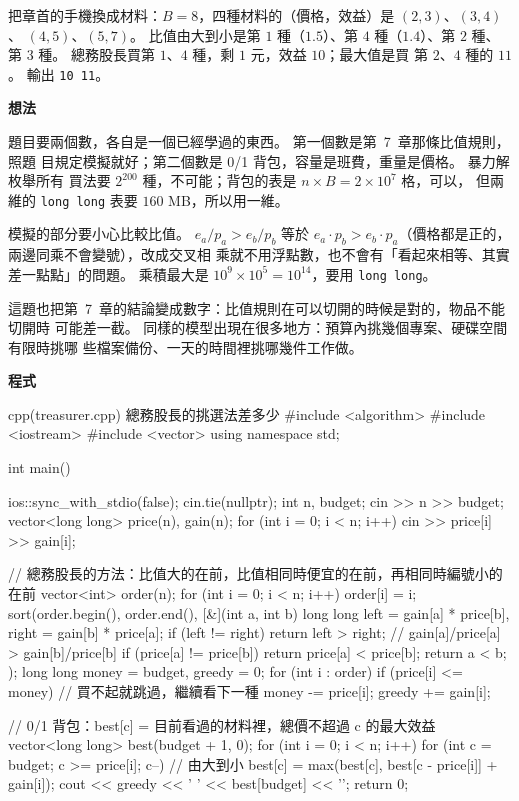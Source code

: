 把章首的手機換成材料：$B = 8$，四種材料的（價格，效益）是 $(2, 3)$、$(3, 4)$、
$(4, 5)$、$(5, 7)$。 比值由大到小是第 $1$ 種（$1.5$）、第 $4$ 種（$1.4$）、第
$2$ 種、第 $3$ 種。 總務股長買第 $1$、$4$ 種，剩 $1$ 元，效益 $10$；最大值是買
第 $2$、$4$ 種的 $11$。 輸出 \texttt{10 11}。

\textbf{想法}

題目要兩個數，各自是一個已經學過的東西。 第一個數是第~7~章那條比值規則，照題
目規定模擬就好；第二個數是 0/1 背包，容量是班費，重量是價格。 暴力解枚舉所有
買法要 $2^{200}$ 種，不可能；背包的表是 $n \times B = 2 \times 10^7$ 格，可以，
但兩維的 \texttt{long long} 表要 $160$ MB，所以用一維。

模擬的部分要小心比較比值。 $e_a / p_a > e_b / p_b$ 等於
$e_a \cdot p_b > e_b \cdot p_a$（價格都是正的，兩邊同乘不會變號），改成交叉相
乘就不用浮點數，也不會有「看起來相等、其實差一點點」的問題。 乘積最大是
$10^9 \times 10^5 = 10^{14}$，要用 \texttt{long long}。

這題也把第~7~章的結論變成數字：比值規則在可以切開的時候是對的，物品不能切開時
可能差一截。 同樣的模型出現在很多地方：預算內挑幾個專案、硬碟空間有限時挑哪
些檔案備份、一天的時間裡挑哪幾件工作做。

\textbf{程式}

\begin{example}[label=ex:treasurer]{cpp}{(treasurer.cpp) 總務股長的挑選法差多少}
#include <algorithm>
#include <iostream>
#include <vector>
using namespace std;

int main() {
    ios::sync_with_stdio(false);
    cin.tie(nullptr);
    int n, budget;
    cin >> n >> budget;
    vector<long long> price(n), gain(n);
    for (int i = 0; i < n; i++) {
        cin >> price[i] >> gain[i];
    }

    // 總務股長的方法：比值大的在前，比值相同時便宜的在前，再相同時編號小的在前
    vector<int> order(n);
    for (int i = 0; i < n; i++) {
        order[i] = i;
    }
    sort(order.begin(), order.end(), [&](int a, int b) {
        long long left = gain[a] * price[b], right = gain[b] * price[a];
        if (left != right) {
            return left > right;          // gain[a]/price[a] > gain[b]/price[b]
        }
        if (price[a] != price[b]) {
            return price[a] < price[b];
        }
        return a < b;
    });
    long long money = budget, greedy = 0;
    for (int i : order) {
        if (price[i] <= money) {          // 買不起就跳過，繼續看下一種
            money -= price[i];
            greedy += gain[i];
        }
    }

    // 0/1 背包：best[c] = 目前看過的材料裡，總價不超過 c 的最大效益
    vector<long long> best(budget + 1, 0);
    for (int i = 0; i < n; i++) {
        for (int c = budget; c >= price[i]; c--) {   // 由大到小
            best[c] = max(best[c], best[c - price[i]] + gain[i]);
        }
    }
    cout << greedy << ' ' << best[budget] << '\n';
    return 0;
}
\end{example}

